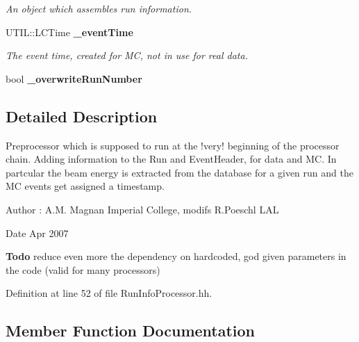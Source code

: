 \begin{DoxyCompactItemize}
\begin{DoxyCompactList}\small\item\em An object which assembles run information. \item\end{DoxyCompactList}\item 
UTIL::LCTime {\bf \_\-eventTime}\label{classmarlin_1_1RunInfoProcessor_a892d2aa27765a45ee078d8bc713aa88f}

\begin{DoxyCompactList}\small\item\em The event time, created for MC, not in use for real data. \item\end{DoxyCompactList}\item 
bool {\bfseries \_\-overwriteRunNumber}\label{classmarlin_1_1RunInfoProcessor_ad5d607ab4fe985cfad5e419a4ea513a8}

\end{DoxyCompactItemize}


\subsection{Detailed Description}
Preprocessor which is supposed to run at the !very! beginning of the processor chain. Adding information to the Run and EventHeader, for data and MC. In partcular the beam energy is extracted from the database for a given run and the MC events get assigned a timestamp. \begin{DoxyAuthor}{Author}
: A.M. Magnan Imperial College, modifs R.Poeschl LAL
\end{DoxyAuthor}
\begin{DoxyDate}{Date}
Apr 2007 
\end{DoxyDate}
\begin{Desc}
\item[{\bf Todo}]reduce even more the dependency on hardcoded, god given parameters in the code (valid for many processors)\end{Desc}


Definition at line 52 of file RunInfoProcessor.hh.

\subsection{Member Function Documentation}
